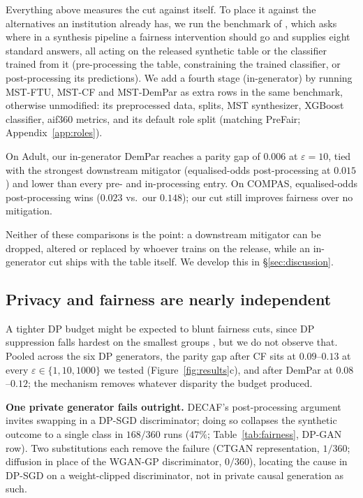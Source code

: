 \documentclass[manuscript,screen,review]{acmart}
\begin{document}
Everything above measures the cut against itself. To place it against the
alternatives an institution already has, we run the benchmark of
\citet{angelozzi2026where}, which asks where in a synthesis pipeline a
fairness intervention should go and supplies eight standard answers, all
acting on the released synthetic table or the classifier trained from it
(pre-processing the table, constraining the trained classifier, or
post-processing its predictions). We add a fourth stage (in-generator)
by running MST-FTU, MST-CF and MST-DemPar as extra rows in the same
benchmark, otherwise unmodified: its preprocessed data, splits, MST
synthesizer, XGBoost classifier, aif360 metrics, and its default role split
(matching PreFair; Appendix~\ref{app:roles}).

On Adult, our in-generator DemPar reaches a parity gap of $0.006$ at
$\varepsilon{=}10$, tied with the strongest downstream mitigator
(equalised-odds post-processing at $0.015$) and lower than every pre- and
in-processing entry. On COMPAS, equalised-odds post-processing wins ($0.023$
vs.\ our $0.148$); our cut still improves fairness over no mitigation.

Neither of these comparisons is the point: a downstream mitigator can be
dropped, altered or replaced by whoever trains on the release, while an
in-generator cut ships with the table itself. We develop this in
\S\ref{sec:discussion}.

\subsection{Privacy and fairness are nearly independent}
\label{sec:privacy}

A tighter DP budget might be expected to blunt fairness cuts, since DP
suppression falls hardest on the smallest groups
\citep{bagdasaryan2019disparate}, but we do not observe that. Pooled across
the six DP generators, the parity gap after CF sits at $0.09$--$0.13$ at
every $\varepsilon \in \{1, 10, 1000\}$ we tested
(Figure~\ref{fig:results}c), and after DemPar at $0.08$--$0.12$; the
mechanism removes whatever disparity the budget produced.

\textbf{One private generator fails outright.} DECAF's post-processing
argument invites swapping in a DP-SGD \citep{abadi2016dpsgd} discriminator;
doing so collapses the synthetic outcome to a single class in $168/360$ runs
($47\%$; Table~\ref{tab:fairness}, DP-GAN row). Two substitutions each remove
the failure (CTGAN representation, $1/360$; diffusion in place of the
WGAN-GP discriminator, $0/360$), locating the cause in DP-SGD on a
weight-clipped discriminator, not in private causal generation as such.
\end{document}
